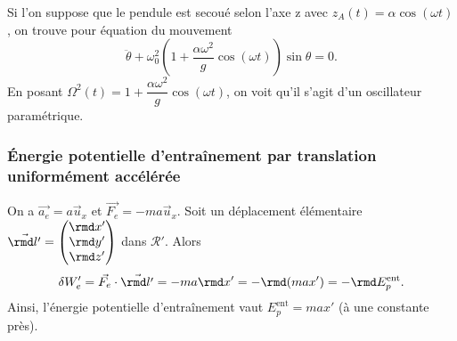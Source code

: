             Si l'on suppose que le pendule est secoué selon l'axe z avec $z_{A}(t)=\alpha\cos(\omega t)$, on trouve pour équation du mouvement
            \begin{equation*}
                \ddot{\theta}+\omega_{0}^{2}\left(1+\frac{\alpha\omega^{2}}{g}\cos(\omega t)\right)\sin\theta = 0.
            \end{equation*}
            En posant $\Omega^{2}(t)=1+\dfrac{\alpha\omega^{2}}{g}\cos(\omega t)$, on voit qu'il s'agit d'un oscillateur paramétrique.

        \subsubsection{Énergie potentielle d'entraînement par translation uniformément accélérée}
            
            On a $\vec{a_e}=a\vec{u}_x$ et $\vec{F_e}=-ma\vec{u}_x$. Soit un déplacement élémentaire $\vec{\rmd l'}=\begin{pmatrix}\rmd x'\\\rmd y'\\\rmd z'\end{pmatrix} $ dans $\mathcal{R}'$. Alors 
            \begin{equation*}
                \delta W_e'=\vec{F_e}\cdot\vec{\rmd l'}=-ma\rmd x'=-\rmd(max')=-\rmd E_p^{\text{ent}}.
            \end{equation*}
            Ainsi, l'énergie potentielle d'entraînement vaut $E_{p}^{\text{ent}}=max'$ (à une constante près).

